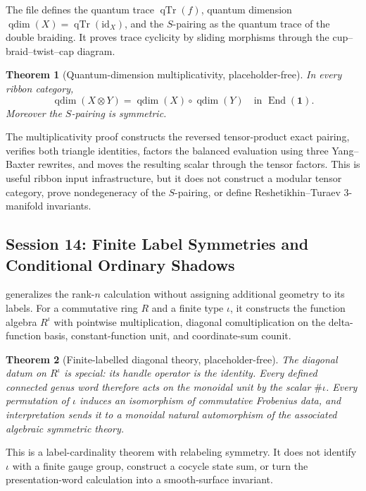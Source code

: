 \documentclass[11pt]{amsart}
\theoremstyle{plain}
\newtheorem{theorem}{Theorem}[section]
\theoremstyle{definition}
\newcommand{\id}{\mathrm{id}}
\begin{document}
The file defines the quantum trace $\operatorname{qTr}(f)$, quantum dimension
$\operatorname{qdim}(X)=\operatorname{qTr}(\id_X)$, and the $S$-pairing as the quantum trace of the double braiding. It proves trace cyclicity by sliding morphisms through the cup--braid--twist--cap diagram.

\begin{theorem}[Quantum-dimension multiplicativity, placeholder-free]
In every ribbon category,
\[
\operatorname{qdim}(X\otimes Y)
=
\operatorname{qdim}(X)\circ\operatorname{qdim}(Y)
\quad\text{in }\operatorname{End}(\mathbf{1}).
\]
Moreover the $S$-pairing is symmetric.
\end{theorem}

The multiplicativity proof constructs the reversed tensor-product exact pairing, verifies both triangle identities, factors the balanced evaluation using three Yang--Baxter rewrites, and moves the resulting scalar through the tensor factors. This is useful ribbon input infrastructure, but it does not construct a modular tensor category, prove nondegeneracy of the $S$-pairing, or define Reshetikhin--Turaev 3-manifold invariants.

\subsection{Session 14: Finite Label Symmetries and Conditional Ordinary Shadows}

 generalizes the rank-$n$ calculation without assigning additional geometry to its labels. For a commutative ring $R$ and a finite type $\iota$, it constructs the function algebra $R^\iota$ with pointwise multiplication, diagonal comultiplication on the delta-function basis, constant-function unit, and coordinate-sum counit.

\begin{theorem}[Finite-labelled diagonal theory, placeholder-free]
The diagonal datum on $R^\iota$ is special: its handle operator is the identity. Every defined connected genus word therefore acts on the monoidal unit by the scalar $\#\iota$. Every permutation of $\iota$ induces an isomorphism of commutative Frobenius data, and interpretation sends it to a monoidal natural automorphism of the associated algebraic symmetric theory.
\end{theorem}

This is a label-cardinality theorem with relabeling symmetry. It does not identify $\iota$ with a finite gauge group, construct a cocycle state sum, or turn the presentation-word calculation into a smooth-surface invariant.
\end{document}
